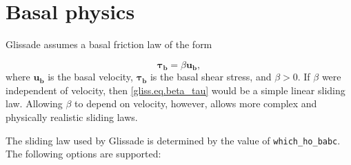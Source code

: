 \section{Basal physics}
\label{sc:glissade-basal-physics}

Glissade assumes a basal friction law of the form 

\begin{equation}
  \mathbf{\tau_b} = \beta \mathbf{u_b},
\end{equation}
%
where $\mathbf{u_b}$ is the basal velocity, $\mathbf{\tau_b}$ is the basal shear stress, and $\beta > 0$. 
If $\beta$ were independent of velocity, then \eqref{gliss.eq.beta_tau}
would be a simple linear sliding law.
Allowing $\beta$ to depend on velocity, however, allows more complex 
and physically realistic sliding laws.

The sliding law used by Glissade is determined by the value of \texttt{which\_ho\_babc}.
The following options are supported:

